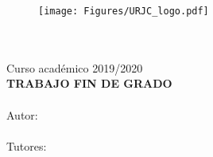 \documentclass[
12pt, %
spanish, %
onehalfspacing, %
parskip, %
headsepline, %
]{MastersDoctoralThesis} %
\author{José Miguel García Benayas} %
\begin{document}
\frontmatter %

\pagestyle{plain} %


\begin{titlepage}
\begin{center}

\vspace*{.01\textheight}
\begin{figure}
\begin{center}
\texttt{[image: Figures/URJC\_logo.pdf]}
\end{center}
\end{figure}
{\Large \MakeUppercase{\facname}}\\[0.5cm]
{\large \MakeUppercase{\degreename}}\\[0.5cm] %
{\large Curso académico 2019/2020}\\[1.5cm] %
{\large \textbf{TRABAJO FIN DE GRADO}}\\[0.5cm] %

{\Large \textbf{\MakeUppercase{\ttitle}}}\\[5cm] %

{\normalsize Autor:\\{\authorname}}\\[0.5cm]  %

{\normalsize Tutores:\\{\supname}}\\ %


\end{center}
\end{titlepage}

\end{document}
